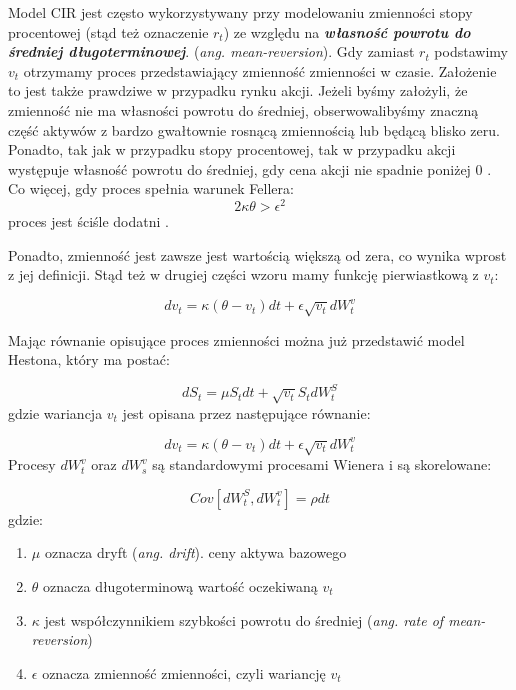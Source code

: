 \documentclass{pracamgr}
\begin{document}
Model CIR jest często wykorzystywany przy modelowaniu zmienności stopy procentowej (stąd też oznaczenie $r_t$) ze względu na \textbf{\textit{własność powrotu do średniej długoterminowej}}. 
(\textit{ang. mean-reversion}). Gdy zamiast $r_t$ podstawimy $v_t$ otrzymamy proces przedstawiający zmienność zmienności w czasie. Założenie to jest także prawdziwe w przypadku rynku 
akcji. Jeżeli byśmy założyli, że zmienność nie ma własności powrotu do średniej, obserwowalibyśmy znaczną część aktywów z bardzo gwałtownie rosnącą zmiennością lub będącą blisko zeru.
Ponadto, tak jak w przypadku stopy procentowej, tak w przypadku akcji występuje własność powrotu do średniej, gdy cena akcji nie spadnie poniżej 0 \cite{TestingMeanReversion}.
Co więcej, gdy proces spełnia warunek Fellera:
\begin{equation}
2 \kappa \theta > \epsilon^2
\end{equation}
proces jest ściśle dodatni \cite{TheLittleHestonTrap}.


Ponadto, zmienność jest zawsze jest wartością większą od zera, co wynika wprost z jej definicji. Stąd też w drugiej części wzoru mamy funkcję pierwiastkową z $v_t$: 

\begin{equation} 
dv_t  = \kappa (\theta - v_t)dt + \epsilon \sqrt{v_t} dW_t^v 
\end{equation}

Mając równanie opisujące proces zmienności można już przedstawić model Hestona, który ma postać:

\begin{equation}
dS_t  = \mu S_t dt + \sqrt{v_t} S_t dW^S_t
\end{equation}
gdzie wariancja $v_t$ jest opisana przez następujące równanie: 

\begin{equation}
dv_t  = \kappa (\theta - v_t)dt + \epsilon \sqrt{v_t} dW_t^v 
\end{equation}
Procesy $dW_t^v$ oraz $dW_s^v$ są standardowymi procesami Wienera i są skorelowane:

\begin{equation}
Cov[dW^S_t, dW^v_t] = \rho dt 
\end{equation}
gdzie:

\begin{enumerate}
\item $\mu$ oznacza dryft (\textit{ang. drift}). ceny aktywa bazowego 
\item $\theta$ oznacza długoterminową wartość oczekiwaną $v_t$
\item $\kappa$ jest współczynnikiem szybkości powrotu do średniej (\textit{ang. rate of mean-reversion})
\item $\epsilon$ oznacza zmienność zmienności, czyli wariancję $v_t$
\end{enumerate}
\end{document}
